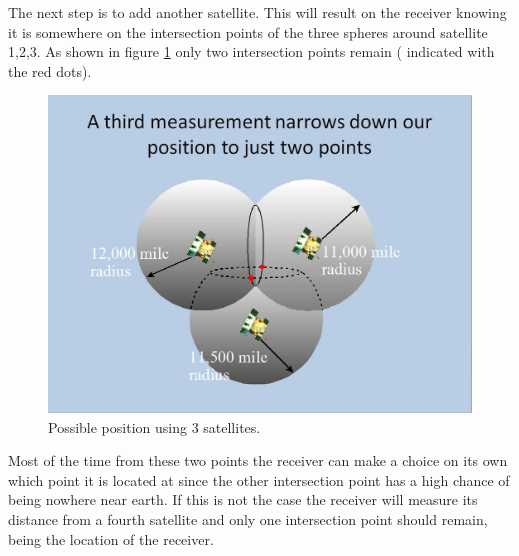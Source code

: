 \documentclass{article}
\begin{document}
The next step is to add another satellite. This will result on the receiver knowing it is somewhere on the intersection points of the three spheres around satellite 1,2,3. As shown in figure \ref{sat3} only two intersection points remain ( indicated with the red dots).

\begin{figure}[H]
	\centering
	\includegraphics[scale=0.25]{figures/3msmts}
	\caption{Possible position using 3 satellites. }
	\label{sat3}
\end{figure}

Most of the time from these two points the receiver can make a choice on its own which point it is located at since the other intersection point has a high chance of being nowhere near earth. If this is not the case the receiver will measure its distance from a fourth satellite and only one intersection point should remain, being the location of the receiver.
\end{document}
